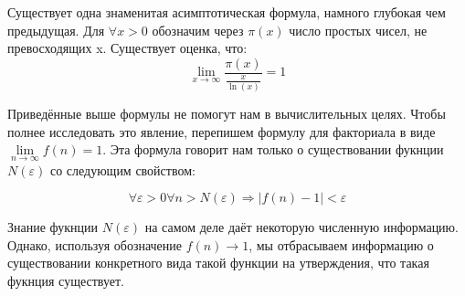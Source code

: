 \documentclass{report}
\begin{document}
Существует одна знаменитая асимптотическая формула, намного глубокая чем предыдущая. Для $\forall x>0$ обозначим через
$\pi(x)$ число простых чисел, не превосходящих x. Существует оценка, что:
\[ \lim\limits_{x\to\infty}\frac{\pi(x)}{\frac{x}{\ln(x)}}=1\]
\begin{center}
\end{center}
Приведённые выше формулы не помогут нам в вычислительных целях.
Чтобы полнее исследовать это явление, перепишем формулу для факториала в виде $\lim\limits_{n\to\infty}f(n)=1$.
Эта формула говорит нам только о существовании фукнции $N(\varepsilon)$ со следующим свойством:
\begin{center}
\[
\forall\varepsilon>0\forall n>N(\varepsilon)\Rightarrow |f(n)-1|<\varepsilon
\]
\end{center}
Знание фукнции $N(\varepsilon)$ на самом деле даёт некоторую численную информацию. Однако, используя обозначение $f(n)\to1$, мы
отбрасываем информацию о существовании конкретного вида такой функции на утверждения, что такая фукнция существует.
\newpage
\end{document}
